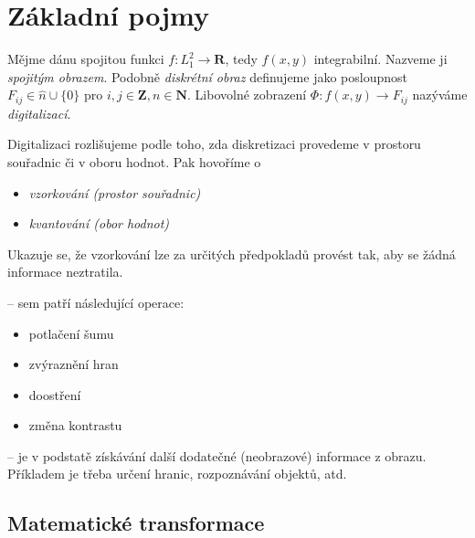 \def\R{\mathbf{R}}
\def\N{\mathbf{N}}
\def\L{\mathbf{L}}
\def\Z{\mathbf{Z}}

\def\bcirc{\mathbin{\mathpalette\makebcirc{\circ}}} 
\def\bast{\mathbin{\mathpalette\makebcirc{\ast}}}
\def\msurr{\mathsurround=0pt}
\def\makebcirc#1#2{%
   \ooalign{$#1\bigcirc\msurr$\cr \hfil$#1#2\msurr$\hfil}}

\def\corr{\bast}
\def\conv{\ast}

\section{Základní pojmy}

Mějme dánu spojitou funkci $f:L_1^2\rightarrow \R$, tedy $f(x,y)$ integrabilní. Nazveme ji {\em spojitým obrazem}.
Podobně {\em diskrétní obraz} definujeme jako posloupnost $F_{ij}\in \hat{n}\cup \{0\}$ pro $i,j\in\Z,n\in\N$.
Libovolné zobrazení $\Phi: f(x,y)\rightarrow F_{ij}$ nazýváme {\em digitalizací}.





Digitalizaci rozlišujeme podle toho, zda diskretizaci provedeme v prostoru souřadnic či v oboru hodnot. Pak hovoříme o
 \begin{itemize}
\item {\em vzorkování (prostor souřadnic)}
\item {\em kvantování (obor hodnot)}
 \end{itemize}

 Ukazuje se, že vzorkování lze za určitých předpokladů provést tak, aby se žádná informace neztratila.
 
 -- sem patří následující operace:
 
 \begin{itemize}
\item potlačení šumu
\item zvýraznění hran
\item doostření
\item změna kontrastu
 \end{itemize}

 -- je v podstatě získávání další dodatečné (neobrazové) informace z obrazu. Příkladem je třeba
určení hranic, rozpoznávání objektů, atd.

\subsection{Matematické transformace}

